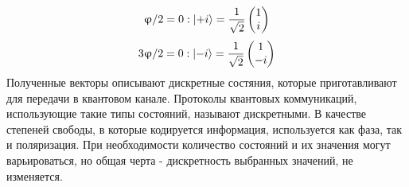 \begin{equation}
  \upvarphi/2 = 0 : \lvert+i\rangle= \frac{1}{\sqrt{2}} \begin{pmatrix} 1 \\ i \end{pmatrix}
\end{equation}\label{eq:pi/2 phase vector}
\begin{equation}
  3\upvarphi/2 = 0 : \lvert-i\rangle= \frac{1}{\sqrt{2}} \begin{pmatrix} 1 \\ -i \end{pmatrix}
\end{equation}\label{eq:3pi/2 phase vector}
Полученные векторы описывают дискретные состяния, которые приготавливают для передачи в квантовом канале. Протоколы квантовых коммуникаций, использующие такие типы состояний, называют дискретными. В качестве степеней свободы, в которые кодируется информация, используется как фаза, так и поляризация. При необходимости количество состояний и их значения могут варьироваться, но общая черта - дискретность выбранных значений, не изменяется.
